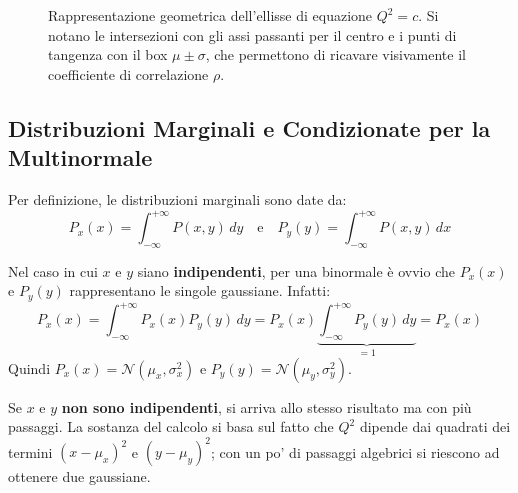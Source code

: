 \documentclass[openany,a4paper,12pt]{book}
\theoremstyle{remark}
\begin{document}
\begin{figure}[htbp]
\caption{Rappresentazione geometrica dell'ellisse di equazione $Q^2 = c$. Si notano le intersezioni con gli assi passanti per il centro e i punti di tangenza con il box $\mu \pm \sigma$, che permettono di ricavare visivamente il coefficiente di correlazione $\rho$.}
\label{fig:ellisse_covarianza}
\end{figure}


\subsection*{Distribuzioni Marginali e Condizionate per la Multinormale}

Per definizione, le distribuzioni marginali sono date da:
\begin{equation}
P_x(x) = \int_{-\infty}^{+\infty} P(x,y) \, dy \quad \text{e} \quad P_y(y) = \int_{-\infty}^{+\infty} P(x,y) \, dx
\end{equation}

Nel caso in cui $x$ e $y$ siano \textbf{indipendenti}, per una binormale è ovvio che $P_x(x)$ e $P_y(y)$ rappresentano le singole gaussiane. Infatti:
\begin{equation*}
P_x(x) = \int_{-\infty}^{+\infty} P_x(x)P_y(y) \, dy = P_x(x) \underbrace{\int_{-\infty}^{+\infty} P_y(y) \, dy}_{=1} = P_x(x)
\end{equation*}
Quindi $P_x(x) = \mathcal{N}(\mu_x, \sigma_x^2)$ e $P_y(y) = \mathcal{N}(\mu_y, \sigma_y^2)$.

Se $x$ e $y$ \textbf{non sono indipendenti}, si arriva allo stesso risultato ma con più passaggi. La sostanza del calcolo si basa sul fatto che $Q^2$ dipende dai quadrati dei termini $(x-\mu_x)^2$ e $(y-\mu_y)^2$; con un po' di passaggi algebrici si riescono ad ottenere due gaussiane.
\end{document}
